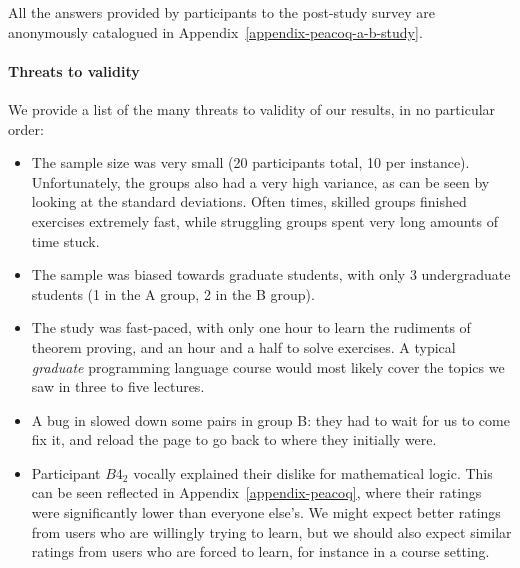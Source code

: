 

All the answers provided by participants to the post-study survey are
anonymously catalogued in Appendix~\ref{appendix-peacoq-a-b-study}.

\paragraph{Threats to validity}

We provide a list of the many threats to validity of our results, in no
particular order:

\begin{itemize}

  \item The sample size was very small (20 participants total, 10 per instance).
Unfortunately, the groups also had a very high variance, as can be seen by
looking at the standard deviations.  Often times, skilled groups finished
exercises extremely fast, while struggling groups spent very long amounts of
time stuck.

  \item The sample was biased towards graduate students, with only 3
undergraduate students (1 in the A group, 2 in the B group).

  \item The study was fast-paced, with only one hour to learn the rudiments of
theorem proving, and an hour and a half to solve exercises.  A typical
\emph{graduate} programming language course would most likely cover the topics
we saw in three to five lectures.

  \item A bug in \PeaCoq{} slowed down some pairs in group B: they had to wait
for us to come fix it, and reload the page to go back to where they initially
were.

  \item Participant $B4_{2}$ vocally explained their dislike for mathematical
logic.  This can be seen reflected in Appendix~\ref{appendix-peacoq}, where
their ratings were significantly lower than everyone else's.  We might expect better ratings from users who are willingly trying to learn, but we should also expect similar ratings from users who are forced to learn, for instance in a course setting.

\end{itemize}

